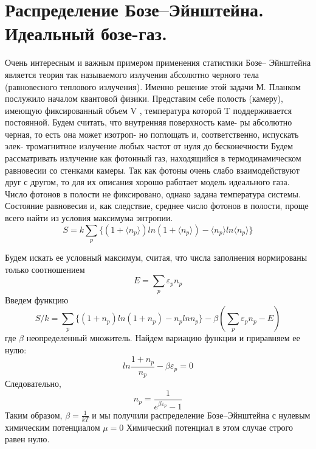 \section{Распределение Бозе–Эйнштейна. Идеальный бозе-газ.}

Очень интересным и важным примером применения статистики Бозе– Эйнштейна является теория так называемого излучения абсолютно черного тела (равновесного теплового излучения). Именно решение этой задачи М. Планком послужило началом квантовой физики. Представим себе полость (камеру), имеющую фиксированный объем V , температура которой T поддерживается постоянной.
Будем считать, что внутренняя поверхность каме- ры абсолютно черная, то есть она может изотроп- но поглощать и, соответственно, испускать элек- тромагнитное излучение любых частот от нуля до бесконечности
Будем рассматривать излучение как фотонный газ, находящийся в термодинамическом равновесии со стенками камеры. Так как фотоны очень слабо взаимодействуют друг с другом, то для их описания хорошо работает модель идеального газа.
\\
Число фотонов в полости не фиксировано, однако задана температура системы. Состояние равновесия и, как следствие, среднее число фотонов в полости, проще всего найти из условия максимума энтропии.
$$
S =k \sum\limits_{p} \{ (1+\langle n_p \rangle)ln(1+\langle n_p \rangle)-\langle n_p\rangle ln\langle n_p \rangle \}
$$

Будем искать ее условный максимум, считая, что числа заполнения нормированы только соотношением
$$E = \sum\limits_{p} \varepsilon_p n_p$$
Введем функцию 
$$
S/k = \sum\limits_{p} \{ (1+ n_p)ln(1+ n_p)- n_p ln n_p \} - \beta(\sum\limits_{p}\varepsilon_pn_p - E)
$$
где $\beta$ неопределенный множитель. Найдем вариацию функции и приравняем ее нулю:
$$ln\frac{1+n_p}{n_p} - \beta\varepsilon_p = 0$$
Следовательно,
$$n_p = \frac{1}{e^{\beta\varepsilon_p} - 1}$$
Таким образом, $\beta = \frac{1}{kT}$ и мы получили распределение Бозе–Эйнштейна с нулевым химическим потенциалом $\mu = 0$
Химический потенциал в этом случае строго равен нулю.
